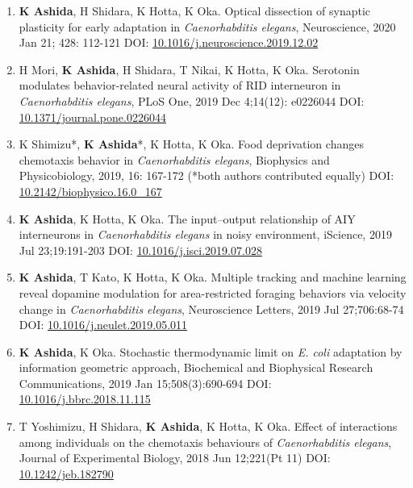 \documentclass[12pt,]{scrartcl}
\begin{document}
\begin{enumerate}
  \leftskip-0.13in %
  \item \textbf{K Ashida}, H Shidara, K Hotta, K Oka. Optical dissection of synaptic plasticity for early adaptation in \textit{Caenorhabditis elegans}, Neuroscience, 2020 Jan 21; 428: 112-121 
      DOI: \href{https://doi.org/10.1016/j.neuroscience.2019.12.026}{10.1016/j.neuroscience.2019.12.02}
  \item  H Mori, \textbf{K Ashida}, H Shidara, T Nikai, K Hotta, K Oka. Serotonin modulates behavior-related neural activity of RID interneuron in \textit{Caenorhabditis elegans}, PLoS One, 2019 Dec 4;14(12): e0226044
        DOI: \href{http://dx.doi.org/10.1371/journal.pone.0226044}{10.1371/journal.pone.0226044}
    \item  K Shimizu*, \textbf{K Ashida}*, K Hotta, K Oka. Food deprivation changes chemotaxis behavior in \textit{Caenorhabditis elegans}, Biophysics and Physicobiology, 2019, 16: 167-172 (*both authors contributed equally)
        DOI: \href{http://dx.doi.org/10.2142/biophysico.16.0_167}{10.2142/biophysico.16.0\_167}
    \item \textbf{K Ashida}, K Hotta, K Oka. The input--output relationship of AIY interneurons in \textit{Caenorhabditis elegans} in noisy environment, iScience, 2019 Jul 23;19:191-203
        DOI: \href{http://dx.doi.org/10.1016/j.isci.2019.07.028}{10.1016/j.isci.2019.07.028}
    \item \textbf{K Ashida}, T Kato, K Hotta, K Oka. Multiple tracking and machine learning reveal dopamine modulation for area-restricted foraging behaviors via velocity change in \textit{Caenorhabditis elegans}, Neuroscience Letters, 2019 Jul 27;706:68-74
        DOI: \href{http://dx.doi.org/10.1016/j.neulet.2019.05.011}{10.1016/j.neulet.2019.05.011}
    \item \textbf{K Ashida}, K Oka. Stochastic thermodynamic limit on \textit{E. coli} adaptation by information geometric approach, Biochemical and Biophysical Research Communications, 2019 Jan 15;508(3):690-694
        DOI: \href{http://dx.doi.org/10.1016/j.bbrc.2018.11.115}{10.1016/j.bbrc.2018.11.115}
    \item T Yoshimizu, H Shidara, \textbf{K Ashida}, K Hotta, K Oka. Effect of interactions among individuals on the chemotaxis behaviours of \textit{Caenorhabditis elegans}, Journal of Experimental Biology, 2018 Jun 12;221(Pt 11)
        DOI: \href{http://dx.doi.org/10.1242/jeb.182790}{10.1242/jeb.182790}
\end{enumerate}
\end{document}
